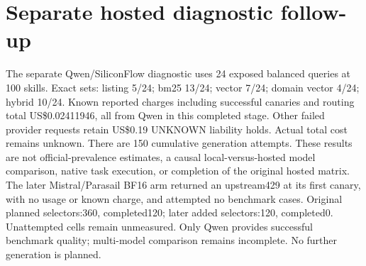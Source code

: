 \section{Separate hosted diagnostic follow-up}The separate Qwen/SiliconFlow diagnostic uses 24 exposed balanced queries at 100 skills. Exact sets: listing 5/24; bm25 13/24; vector 7/24; domain vector 4/24; hybrid 10/24. Known reported charges including successful canaries and routing total US\$0.02411946, all from Qwen in this completed stage. Other failed provider requests retain US\$0.19 UNKNOWN liability holds. Actual total cost remains unknown. There are 150 cumulative generation attempts. These results are not official-prevalence estimates, a causal local-versus-hosted model comparison, native task execution, or completion of the original hosted matrix. The later Mistral/Parasail BF16 arm returned an upstream429 at its first canary, with no usage or known charge, and attempted no benchmark cases. Original planned selectors:360, completed120; later added selectors:120, completed0. Unattempted cells remain unmeasured. Only Qwen provides successful benchmark quality; multi-model comparison remains incomplete. No further generation is planned.
